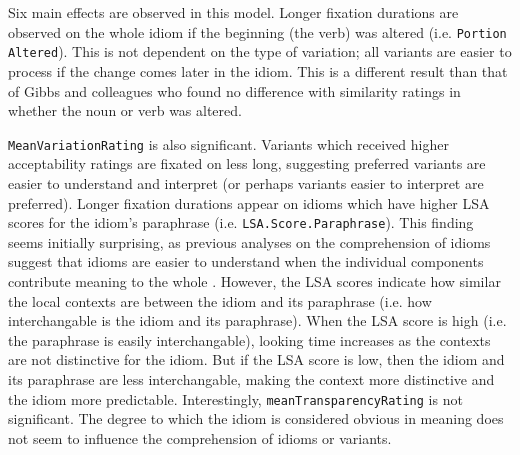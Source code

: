 \documentclass[output=paper
,modfonts
,nonflat]{langsci/langscibook}
\begin{document}



Six main effects are observed in this model. Longer fixation durations are observed on the whole idiom if the beginning (the verb) was altered (i.e. \texttt{Portion Altered}). This is not dependent on the type of variation; all variants are easier to process if the change comes later in the idiom. This is a different result than that of Gibbs and colleagues \citep{GibbsEtAl1989, GibbsNayak1989} who found no difference with similarity ratings in whether the noun or verb was altered. %

\texttt{MeanVariationRating} is also significant. Variants which received higher acceptability ratings are fixated on less long, suggesting preferred variants are easier to understand and interpret (or perhaps variants easier to interpret are preferred). Longer fixation durations appear on idioms which have higher LSA scores for the idiom's paraphrase (i.e. \texttt{LSA.Score.Paraphrase}). This finding seems initially surprising, as previous analyses on the comprehension of idioms suggest that idioms are easier to understand when the individual components contribute meaning to the whole \citep{GibbsEtAl1989}. However, the LSA scores indicate how similar the local contexts are between the idiom and its paraphrase (i.e. how interchangable is the idiom and its paraphrase). When the LSA score is high (i.e. the paraphrase is easily interchangable), looking time increases as the contexts are not distinctive for the idiom. But if the LSA score is low, then the idiom and its paraphrase are less interchangable, making the context more distinctive and the idiom more predictable. Interestingly, \texttt{meanTransparencyRating} is not significant. The degree to which the idiom is considered obvious in meaning does not seem to influence the comprehension of idioms or variants. %
\end{document}
